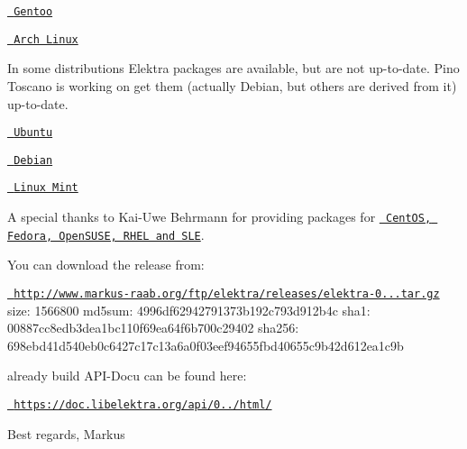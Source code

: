 \begin{DoxyItemize}
\item \href{http://packages.gentoo.org/package/app-admin/elektra}{\texttt{ Gentoo}}
\item \href{https://aur.archlinux.org/packages/elektra/}{\texttt{ Arch Linux}}
\end{DoxyItemize}

In some distributions Elektra packages are available, but are not up-\/to-\/date. Pino Toscano is working on get them (actually Debian, but others are derived from it) up-\/to-\/date.


\begin{DoxyItemize}
\item \href{https://launchpad.net/ubuntu/+source/elektra}{\texttt{ Ubuntu}}
\item \href{https://packages.debian.org/de/wheezy/libelektra3}{\texttt{ Debian}}
\item \href{http://community.linuxmint.com/software/view/elektra}{\texttt{ Linux Mint}}
\end{DoxyItemize}

A special thanks to Kai-\/\+Uwe Behrmann for providing packages for \href{http://software.opensuse.org/download.html?project=home%3Abekun&package=elektra}{\texttt{ Cent\+OS, Fedora, Open\+S\+U\+SE, R\+H\+EL and S\+LE}}.

You can download the release from\+:

\href{http://www.markus-raab.org/ftp/elektra/releases/elektra-0.8.7.tar.gz}{\texttt{ http\+://www.\+markus-\/raab.\+org/ftp/elektra/releases/elektra-\/0...\+tar.\+gz}} size\+: 1566800 md5sum\+: 4996df62942791373b192c793d912b4c sha1\+: 00887cc8edb3dea1bc110f69ea64f6b700c29402 sha256\+: 698ebd41d540eb0c6427c17c13a6a0f03eef94655fbd40655c9b42d612ea1c9b

already build A\+P\+I-\/\+Docu can be found here\+:

\href{https://doc.libelektra.org/api/0.8.7/html/}{\texttt{ https\+://doc.\+libelektra.\+org/api/0../html/}}

Best regards, Markus 